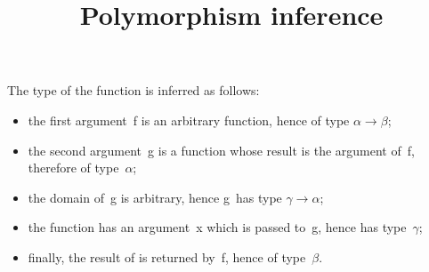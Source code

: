 \documentclass[wide]{slides}
\begin{document}
\begin{slide}
  \title{Polymorphism inference}

  \noindent{}

  \noindent{}

  \bigskip

  The type of the function  is inferred as follows:
  \begin{itemize}

    \item the first argument~\textsf{f} is an arbitrary function,
      hence of type \(\alpha \rightarrow \beta\);

    \item the second argument~\textsf{g} is a function whose result is
      the argument of~\textsf{f}, therefore of type~\(\alpha\);

    \item the domain of~\textsf{g} is arbitrary, hence \textsf{g}~has
      type \(\gamma \rightarrow \alpha\);

    \item the function  has an argument~\textsf{x}
      which is passed to~\textsf{g}, hence has type~\(\gamma\);

    \item finally, the result of  is returned
      by~\textsf{f}, hence of type~\(\beta\).

  \end{itemize}

\end{slide}
\end{document}
